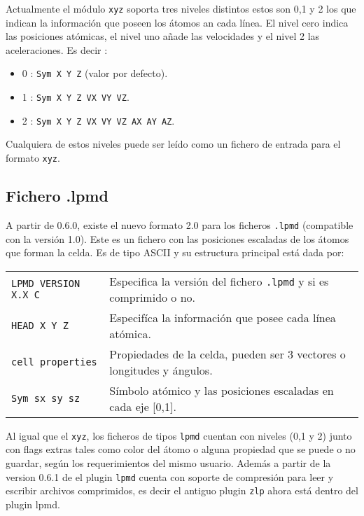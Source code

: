 Actualmente el m\'odulo \verb|xyz| soporta tres niveles distintos estos son 0,1 y 2 los que indican la informaci\'on que poseen los \'atomos an cada l\'inea. El nivel cero indica las posiciones at\'omicas, el nivel uno a\~nade las velocidades y el nivel 2 las aceleraciones. Es decir :

\begin{itemize}
\item 0 : \verb|Sym X Y Z| (valor por defecto).
\item 1 : \verb|Sym X Y Z VX VY VZ|.
\item 2 : \verb|Sym X Y Z VX VY VZ AX AY AZ|.
\end{itemize}

Cualquiera de estos niveles puede ser le\'ido como un fichero de entrada para el formato \verb|xyz|.

\subsection{Fichero .lpmd}

A partir de {\lpmd} 0.6.0, existe el nuevo formato 2.0 para los ficheros \verb|.lpmd| (compatible con la versi\'on 1.0). Este es un fichero con las posiciones escaladas de los \'atomos que forman la celda. Es de tipo ASCII y su estructura principal est\'a dada por:

\begin{center}
 \begin{tabular}{l|l}
 \verb|LPMD VERSION X.X C| & Especifica la versi\'on del fichero \verb|.lpmd| y si es comprimido o no. \\
 \verb|HEAD X Y Z| & Especif\'ica la informaci\'on que posee cada l\'inea at\'omica. \\
 \verb|cell properties | & Propiedades de la celda, pueden ser 3 vectores o longitudes y \'angulos. \\
 \verb|Sym sx sy sz| & S\'imbolo at\'omico y las posiciones escaladas en cada eje [0,1].\\
\end{tabular}
\end{center}

Al igual que el \verb|xyz|, los ficheros de tipos \verb|lpmd| cuentan con niveles (0,1 y 2) junto con flags extras tales como color del \'atomo o alguna propiedad que se puede o no guardar, seg\'un los requerimientos del mismo usuario. Adem\'as a partir de la version 0.6.1 de {\lpmd} el plugin \verb|lpmd| cuenta con soporte de compresi\'on para leer y escribir archivos comprimidos, es decir el antiguo plugin \verb|zlp| ahora est\'a dentro del plugin lpmd.

